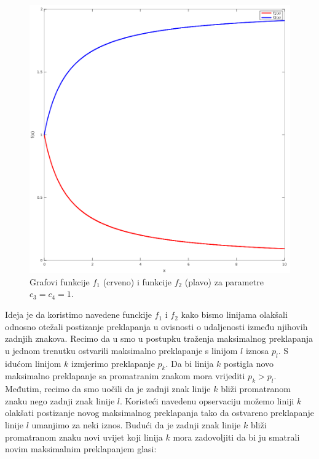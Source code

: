 \documentclass[times, utf8, zavrsni]{fer}
\begin{document}
\begin{figure}[htb]
    \centering
    \captionsetup{justification=centering,margin=2cm}
    \includegraphics[width=\textwidth]{images/function-01.png}
    \caption{
        Grafovi funkcije $f_1$ (crveno) i funkcije $f_2$ (plavo) za parametre
        $c_3 = c_4 = 1$.
    }
    \label{fig:function-01}
\end{figure}

Ideja je da koristimo navedene funckije $f_1$ i $f_2$ kako bismo linijama
olakšali odnosno otežali postizanje preklapanja u ovisnosti o udaljenosti između
njihovih zadnjih znakova. Recimo da u smo u postupku traženja maksimalnog
preklapanja u jednom trenutku ostvarili maksimalno preklapanje s linijom $l$
iznosa $p_l$. S idućom linijom $k$ izmjerimo preklapanje $p_k$. Da bi linija
$k$ postigla novo maksimalno preklapanje sa promatranim znakom mora vrijediti
$p_k > p_l$. Međutim, recimo da smo uočili da je zadnji znak linije $k$
bliži promatranom znaku nego zadnji znak linije $l$. Koristeći navedenu
opservaciju možemo liniji $k$ olakšati postizanje novog maksimalnog
preklapanja tako da ostvareno preklapanje linije $l$ umanjimo za neki iznos.
Budući da je zadnji znak linije $k$ bliži promatranom znaku novi uvijet koji
linija $k$ mora zadovoljiti da bi ju smatrali novim maksimalnim preklapanjem
glasi:
\end{document}
